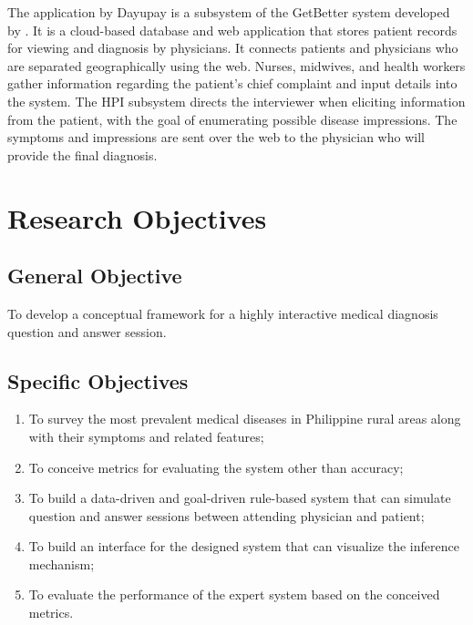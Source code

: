 The application by Dayupay is a subsystem of the GetBetter system developed by .
It is a cloud-based database and web application that stores patient records for viewing and diagnosis by physicians.
It connects patients and physicians who are separated geographically using the web.
Nurses, midwives, and health workers gather information regarding the patient's chief complaint and input details into the system.
The HPI subsystem directs the interviewer when eliciting information from the patient, with the goal of enumerating possible disease impressions.
The symptoms and impressions are sent over the web to the physician who will provide the final diagnosis.    

\section{Research Objectives}
\label{sec:researchobjectives}

\subsection{General Objective}
\label{sec:generalobjective}

To develop a conceptual framework for a highly interactive medical diagnosis question and answer session.

\subsection{Specific Objectives}
\label{sec:specificobjectives}


\begin{enumerate}
    \item To survey the most prevalent medical diseases in Philippine rural areas along with their symptoms and related features;
    \item To conceive metrics for evaluating the system other than accuracy;
    \item To build a data-driven and goal-driven rule-based system that can simulate question and answer sessions between attending physician and patient;
    \item To build an interface for the designed system that can visualize the inference mechanism; %
    \item To evaluate the performance of the expert system based on the conceived metrics.
\end{enumerate}


